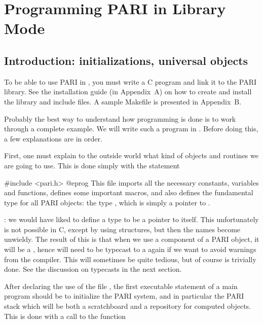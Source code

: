 %
%
\chapter{Programming PARI in Library Mode}

\section{Introduction: initializations, universal objects}
\label{se:intro4}

\noindent
To be able to use PARI in , you must write a C program and
link it to the PARI library. See the installation guide (in Appendix~A)
on how to create and install the library and include files. A sample Makefile
is presented in Appendix~B.

Probably the best way to understand how programming is done is to work
through a complete example. We will write such a program in
. Before doing this, a few explanations are in order.

First, one must explain to the outside world what kind of objects and
routines we are going to use. This is done simply with the statement

\bprog
#include <pari.h>
@eprog
\noindent
This file  imports all the necessary constants,
variables and functions, defines some important macros, and also defines the
fundamental type for all PARI objects: the type , which is
simply a pointer to .

: we would have liked to define a type 
to be a pointer to itself. This unfortunately is not possible in C, except by
using structures, but then the names become unwieldy. The result of this is
that when we use a component of a PARI object, it will be a ,
hence will need to be typecast to a  again if we want to avoid
warnings from the compiler. This will sometimes be quite tedious, but of
course is trivially done. See the discussion on typecasts in the next
section.

After declaring the use of the file , the first executable
statement of a main program should be to initialize the PARI system, and in
particular the PARI stack which will be both a scratchboard and a repository
for computed objects. This is done with a call to the function


